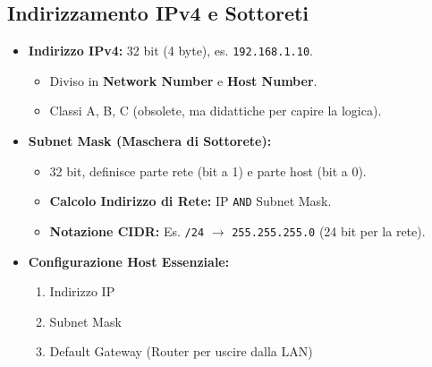 \subsection{Indirizzamento IPv4 e Sottoreti}
\begin{itemize}
    \item \textbf{Indirizzo IPv4:} 32 bit (4 byte), es. \texttt{192.168.1.10}.
        \begin{itemize}
            \item Diviso in \textbf{Network Number} e \textbf{Host Number}.
            \item Classi A, B, C (obsolete, ma didattiche per capire la logica).
        \end{itemize}
    \item \textbf{Subnet Mask (Maschera di Sottorete):}
        \begin{itemize}
            \item 32 bit, definisce parte rete (bit a 1) e parte host (bit a 0).
            \item \textbf{Calcolo Indirizzo di Rete:} IP \texttt{AND} Subnet Mask.
            \item \textbf{Notazione CIDR:} Es. \texttt{/24} $\rightarrow$ \texttt{255.255.255.0} (24 bit per la rete).
        \end{itemize}
    \item \textbf{Configurazione Host Essenziale:}
        \begin{enumerate}
            \item Indirizzo IP
            \item Subnet Mask
            \item Default Gateway (Router per uscire dalla LAN)
        \end{enumerate}
\end{itemize}


